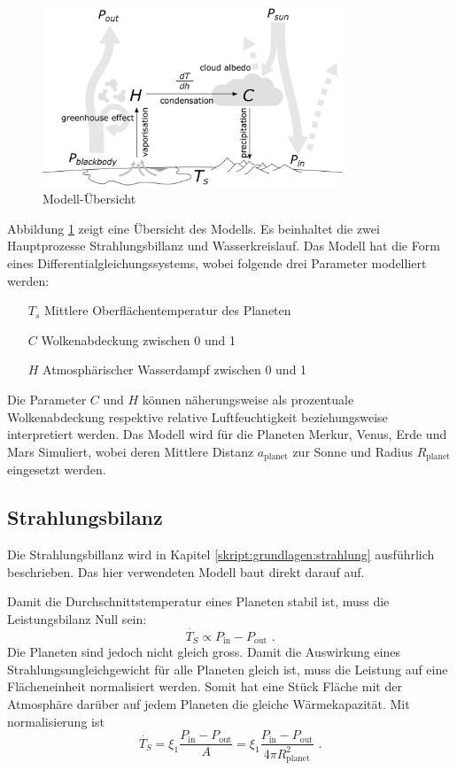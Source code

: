 \begin{refsection}
\begin{figure}
	\centering
	\includegraphics[width=0.8\textwidth]{planeten/Pictures/Model.eps}
	\caption{Modell-Übersicht}
	\label{planeten:model}
\end{figure}
Abbildung \ref{planeten:model} zeigt eine Übersicht des Modells. Es beinhaltet die zwei Hauptprozesse  Strahlungsbillanz und Wasserkreislauf.	
Das Modell hat die Form eines Differentialgleichungssystems, wobei folgende drei Parameter modelliert werden:
\begin{itemize}
\item [$T_s$]	Mittlere Oberflächentemperatur des Planeten
\item [$C$]		Wolkenabdeckung zwischen 0 und 1
\item [$H$]		Atmosphärischer Wasserdampf zwischen 0 und 1
\end{itemize}
Die Parameter $C$ und $H$ können näherungsweise als prozentuale Wolkenabdeckung respektive relative Luftfeuchtigkeit beziehungsweise interpretiert werden.
Das Modell wird für die Planeten Merkur, Venus, Erde und Mars Simuliert, wobei deren Mittlere Distanz $a_\text{planet}$ zur Sonne und Radius $R_\text{planet}$ eingesetzt werden.

\subsection{Strahlungsbilanz}
Die Strahlungsbillanz wird in Kapitel \ref{skript:grundlagen:strahlung} ausführlich beschrieben. Das hier verwendeten Modell baut direkt darauf auf.

Damit die Durchschnittstemperatur eines Planeten stabil ist, muss die Leistungsbilanz Null sein:
\begin{equation}
\dot{T_S} \propto P_{\text{in}} - P_{\text{out}}\text{ .}
\end{equation}
Die Planeten sind jedoch nicht gleich gross. Damit die Auswirkung eines Strahlungsungleichgewicht für alle Planeten gleich ist, muss die Leistung auf eine Flächeneinheit normalisiert werden. Somit hat eine Stück Fläche mit der Atmosphäre darüber auf jedem Planeten die gleiche Wärmekapazität. Mit normalisierung ist
\begin{equation}
\dot{T_S} = \xi_1 \frac{P_{\text{in}} - P_{\text{out}}}{A} = \xi_1 \frac{P_{\text{in}} - P_{\text{out}}}{4 \pi R_{\text{planet}}^2}\text{ .}
\end{equation}


\end{refsection}
